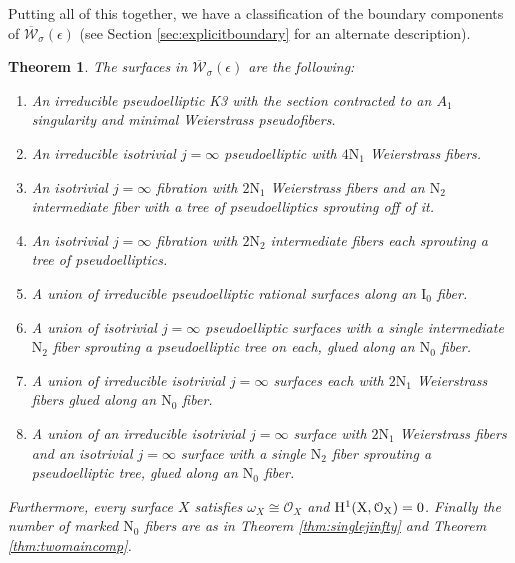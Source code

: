 \documentclass[11pt]{amsart}
\newtheorem{theorem}{Theorem}[section]
\theoremstyle{definition}
\theoremstyle{remark}
\newcommand{\calO}{\mathcal O}
\newcommand{\kepsilon}{\overline{\mathcal{W}}_\sigma(\epsilon)}
\begin{document}
	
	
	Putting all of this together, we have a classification of the boundary components of $\kepsilon$ (see Section \ref{sec:explicitboundary} for an alternate description). 
	
	
	
	\begin{theorem}\label{thm:kepsilon} The surfaces in $\kepsilon$  are the following:
		
		\begin{enumerate} 
			\item[(A)] An irreducible pseudoelliptic K3 with the section contracted to an $A_1$ singularity and minimal Weierstrass pseudofibers. 
			
			\item[(B)] An irreducible isotrivial $j = \infty$ pseudoelliptic with $4\mathrm{N}_1$ Weierstrass fibers.
			
			\item[(C)] An isotrivial $j = \infty$ fibration with $2\mathrm{N}_1$ Weierstrass fibers and an $\mathrm{N}_2$ intermediate fiber with a tree of pseudoelliptics sprouting off of it. 
			
			\item[(D)] An isotrivial $j = \infty$ fibration with $2\mathrm{N}_2$ intermediate fibers each sprouting a tree of pseudoelliptics.
			
			\item[(E)] A union of irreducible pseudoelliptic rational surfaces along an $\mathrm{I}_0$ fiber. 
			
			\item[(F)] A union of isotrivial $j = \infty$ pseudoelliptic surfaces with a single intermediate $\mathrm{N}_2$ fiber sprouting a pseudoelliptic tree on each, glued along an $\mathrm{N}_0$ fiber. 
			
			\item[(G)] A union of irreducible isotrivial $j = \infty$ surfaces each with $2\mathrm{N}_1$ Weierstrass fibers glued along an $\mathrm{N}_0$ fiber. 
			
			\item[(H)] A union of an irreducible isotrivial $j = \infty$ surface with $2\mathrm{N}_1$ Weierstrass fibers and an isotrivial $j = \infty$ surface with a single $\mathrm{N}_2$ fiber sprouting a pseudoelliptic tree, glued along an $\mathrm{N}_0$ fiber. 
			
		\end{enumerate}
		
		Furthermore, every surface $X$ satisfies $\omega_X \cong \calO_X$ and $\rm H^1(X, \calO_X) = 0$. Finally the number of marked $\mathrm{N}_0$ fibers are as in Theorem \ref{thm:singlejinfty} and Theorem \ref{thm:twomaincomp}.
	\end{theorem} 
	
\end{document}
